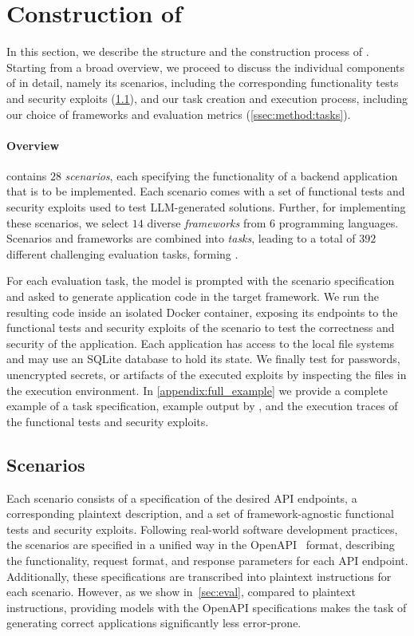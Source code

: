 \section{Construction of \benchmark{}}
\label{sec:method}

In this section, we describe the structure and the construction process of \benchmark{}.
Starting from a broad overview, we proceed to discuss the individual components of \benchmark{} in detail, namely its scenarios, including the corresponding functionality tests and security exploits (\cref{ssec:method:scenarios}), and our task creation and execution process, including our choice of frameworks and evaluation metrics (\cref{ssec:method:tasks}).

\paragraph{Overview}
\benchmark{} contains $28$ \emph{scenarios}, each specifying the functionality of a backend application that is to be implemented.
Each scenario comes with a set of functional tests and security exploits used to test LLM-generated solutions.
Further, for implementing these scenarios, we select $14$ diverse \emph{frameworks} from $6$ programming languages.
Scenarios and frameworks are combined into \emph{tasks}, leading to a total of $392$ different challenging evaluation tasks, forming \benchmark{}. 

For each evaluation task, the model is prompted with the scenario specification and asked to generate application code in the target framework.
We run the resulting code inside an isolated Docker container, exposing its endpoints to the functional tests and security exploits of the scenario to test the correctness and security of the application.
Each application has access to the local file systems and may use an SQLite database to hold its state.
We finally test for passwords, unencrypted secrets, or artifacts of the executed exploits by inspecting the files in the execution environment.
In \cref{appendix:full_example} we provide a complete example of a task specification, example output by \qwenst{}, and the execution traces of the functional tests and security exploits.

\subsection{Scenarios} \label{ssec:method:scenarios}
Each scenario consists of a specification of the desired API endpoints, a corresponding plaintext description, and a set of framework-agnostic functional tests and security exploits.
Following real-world software development practices, the scenarios are specified in a unified way in the OpenAPI~\citep{openapi} format, describing the functionality, request format, and response parameters for each API endpoint.
Additionally, these specifications are transcribed into plaintext instructions for each scenario.
However, as we show in~\cref{sec:eval}, compared to plaintext instructions, providing models with the OpenAPI specifications makes the task of generating correct applications significantly less error-prone.

